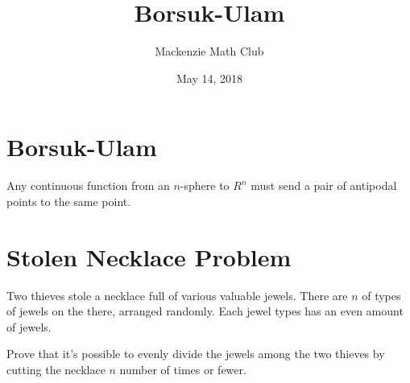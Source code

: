 

\title{Borsuk-Ulam}
\author{Mackenzie Math Club}
\date{May 14, 2018}



	\section*{Borsuk-Ulam}
		Any continuous function from an $n$-sphere to $R^n$ must send a pair of antipodal points to the same point.
	\section*{Stolen Necklace Problem}
		Two thieves stole a necklace full of various valuable jewels.
		There are $n$ of types of jewels on the there, arranged randomly.
		Each jewel types has an even amount of jewels.
		
		Prove that it's possible to evenly divide the jewels among the two thieves by cutting the necklace $n$ number of times or fewer.

